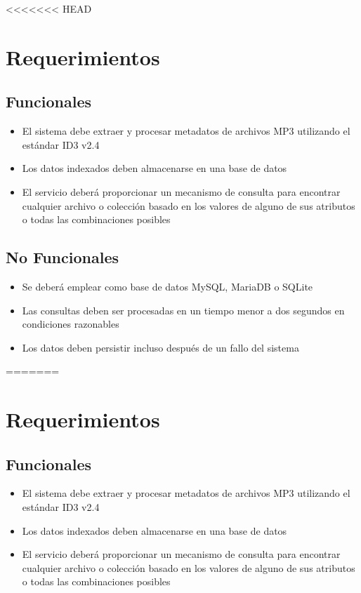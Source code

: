 <<<<<<< HEAD

\section*{Requerimientos}

\subsection*{Funcionales}
\begin{itemize}
	\item El sistema debe extraer y procesar metadatos de archivos MP3 utilizando el 
	estándar ID3 v2.4
	\item Los datos indexados deben almacenarse en una base de datos
	\item El servicio deberá proporcionar un mecanismo de consulta para encontrar 
	cualquier archivo o colección basado en los valores de alguno de sus atributos o 
	todas las combinaciones posibles
\end{itemize}

\subsection*{No Funcionales}
\begin{itemize}
	\item Se deberá emplear como base de datos MySQL, MariaDB o SQLite
	\item Las consultas deben ser procesadas en un tiempo menor a dos segundos en
	condiciones razonables
	\item Los datos deben persistir incluso después de un fallo del sistema
\end{itemize}
=======

\section*{Requerimientos}

\subsection*{Funcionales}
\begin{itemize}
	\item El sistema debe extraer y procesar metadatos de archivos MP3 utilizando el 
	estándar ID3 v2.4
	\item Los datos indexados deben almacenarse en una base de datos
	\item El servicio deberá proporcionar un mecanismo de consulta para encontrar 
	cualquier archivo o colección basado en los valores de alguno de sus atributos o 
	todas las combinaciones posibles
\end{itemize}


